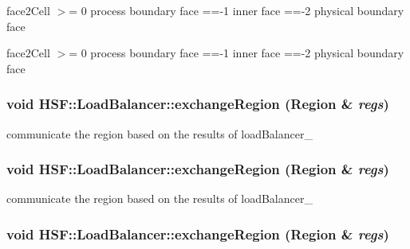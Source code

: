 face2Cell $>$= 0 process boundary face ==-\/1 inner face ==-\/2 physical boundary face

face2Cell $>$= 0 process boundary face ==-\/1 inner face ==-\/2 physical boundary face \hypertarget{classHSF_1_1LoadBalancer_aff34a6877828f65b92b9e146eaaced3b}{
\subsubsection[{exchangeRegion}]{\setlength{\rightskip}{0pt plus 5cm}void HSF::LoadBalancer::exchangeRegion ({\bf Region} \& {\em regs})}}
\label{classHSF_1_1LoadBalancer_aff34a6877828f65b92b9e146eaaced3b}


communicate the region based on the results of loadBalancer\_ \hypertarget{classHSF_1_1LoadBalancer_aff34a6877828f65b92b9e146eaaced3b}{
\subsubsection[{exchangeRegion}]{\setlength{\rightskip}{0pt plus 5cm}void HSF::LoadBalancer::exchangeRegion ({\bf Region} \& {\em regs})}}
\label{classHSF_1_1LoadBalancer_aff34a6877828f65b92b9e146eaaced3b}


communicate the region based on the results of loadBalancer\_ \hypertarget{classHSF_1_1LoadBalancer_aff34a6877828f65b92b9e146eaaced3b}{
\subsubsection[{exchangeRegion}]{\setlength{\rightskip}{0pt plus 5cm}void HSF::LoadBalancer::exchangeRegion ({\bf Region} \& {\em regs})}}
\label{classHSF_1_1LoadBalancer_aff34a6877828f65b92b9e146eaaced3b}


